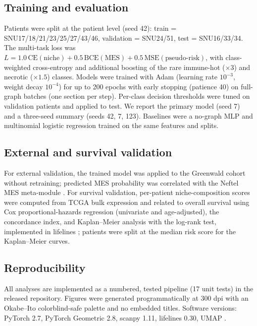 \documentclass[11pt,letterpaper]{article}
\begin{document}
\subsection{Training and evaluation}

Patients were split at the patient level (seed 42): train = SNU17/18/21/23/25/27/43/46, validation = SNU24/51, test = SNU16/33/34. The multi-task loss was $L = 1.0\,\mathrm{CE}(\text{niche}) + 0.5\,\mathrm{BCE}(\text{MES}) + 0.5\,\mathrm{MSE}(\text{pseudo-risk})$, with class-weighted cross-entropy and additional boosting of the rare immune-hot ($\times3$) and necrotic ($\times1.5$) classes. Models were trained with Adam (learning rate $10^{-3}$, weight decay $10^{-4}$) for up to 200 epochs with early stopping (patience 40) on full-graph batches (one section per step). Per-class decision thresholds were tuned on validation patients and applied to test. We report the primary model (seed 7) and a three-seed summary (seeds 42, 7, 123). Baselines were a no-graph MLP and multinomial logistic regression trained on the same features and splits.

\subsection{External and survival validation}

For external validation, the trained model was applied to the Greenwald cohort without retraining; predicted MES probability was correlated with the Neftel MES meta-module \cite{neftel2019}. For survival validation, per-patient niche-composition scores were computed from TCGA bulk expression and related to overall survival using Cox proportional-hazards regression (univariate and age-adjusted), the concordance index, and Kaplan--Meier analysis with the log-rank test, implemented in lifelines \cite{davidsonpilon2019}; patients were split at the median risk score for the Kaplan--Meier curves.

\subsection{Reproducibility}

All analyses are implemented as a numbered, tested pipeline (17 unit tests) in the released repository. Figures were generated programmatically at 300 dpi with an Okabe--Ito colorblind-safe palette and no embedded titles. Software versions: PyTorch 2.7, PyTorch Geometric 2.8, scanpy 1.11, lifelines 0.30, UMAP \cite{mcinnes2018}.
\end{document}
